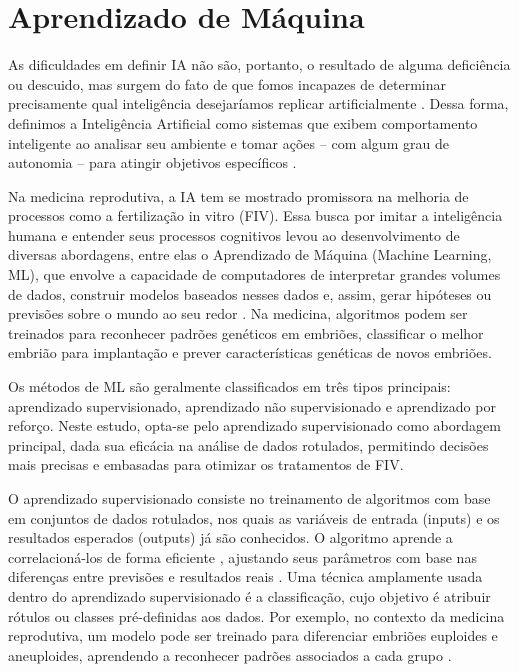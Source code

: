 \section{Aprendizado de Máquina}

As dificuldades em definir IA não são, portanto, o resultado de alguma deficiência ou descuido, mas surgem do fato de que fomos incapazes de determinar precisamente qual inteligência desejaríamos replicar artificialmente \cite{sheikh2023}. Dessa forma, definimos a Inteligência Artificial como sistemas que exibem comportamento inteligente ao analisar seu ambiente e tomar ações {–} com algum grau de autonomia {–} para atingir objetivos específicos \cite{sheikh2023}. 

Na medicina reprodutiva, a IA tem se mostrado promissora na melhoria de processos como a fertilização in vitro (FIV). Essa busca por imitar a inteligência humana e entender seus processos cognitivos levou ao desenvolvimento de diversas abordagens, entre elas o Aprendizado de Máquina (Machine Learning, ML), que envolve a capacidade de computadores de interpretar grandes volumes de dados, construir modelos baseados nesses dados e, assim, gerar hipóteses ou previsões sobre o mundo ao seu redor \cite{russell2016}. Na medicina, algoritmos podem ser treinados para reconhecer padrões genéticos em embriões, classificar o melhor embrião para implantação e prever características genéticas de novos embriões. 

Os métodos de ML são geralmente classificados em três tipos principais: aprendizado supervisionado, aprendizado não supervisionado e aprendizado por reforço. Neste estudo, opta-se pelo aprendizado supervisionado como abordagem principal, dada sua eficácia na análise de dados rotulados, permitindo decisões mais precisas e embasadas para otimizar os tratamentos de FIV.

O aprendizado supervisionado consiste no treinamento de algoritmos com base em conjuntos de dados rotulados, nos quais as variáveis de entrada (inputs) e os resultados esperados (outputs) já são conhecidos. O algoritmo aprende a correlacioná-los de forma eficiente \cite{russell2016}, ajustando seus parâmetros com base nas diferenças entre previsões e resultados reais \cite{trask2019}. Uma técnica amplamente usada dentro do aprendizado supervisionado é a classificação, cujo objetivo é atribuir rótulos ou classes pré-definidas aos dados. Por exemplo, no contexto da medicina reprodutiva, um modelo pode ser treinado para diferenciar embriões euploides e aneuploides, aprendendo a reconhecer padrões associados a cada grupo \cite{izbicki2020}.

